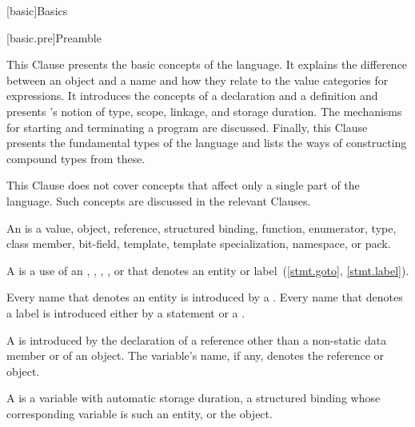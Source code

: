 [basic]{Basics}


[basic.pre]{Preamble}

\pnum
\begin{note}
This Clause presents the basic concepts of the \Cpp{} language.
It explains the difference between an object and a
name and how they relate to the value categories for expressions.
It introduces the concepts of a
declaration and a definition and presents \Cpp{}'s
notion of type, scope, linkage, and
storage duration. The mechanisms for starting and
terminating a program are discussed. Finally, this Clause presents the
fundamental types of the language and lists the ways of constructing
compound types from these.
\end{note}

\pnum
\begin{note}
This Clause does not cover concepts that affect only a single
part of the language. Such concepts are discussed in the relevant
Clauses.
\end{note}

\pnum
{}%
%
%
%
%
%
An  is a value, object, reference,
structured binding,
function, enumerator, type,
class member, bit-field, template, template specialization, namespace, or
pack.

\pnum
A  is a use of an ,
,
,
, or
 that denotes an entity or
label~(\ref{stmt.goto}, \ref{stmt.label}).

\pnum
Every name that denotes an entity is introduced by a
. Every name that denotes a label is introduced
either by a  statement or a
.

\pnum
A  is introduced by the
declaration of
a reference other than a non-static data member or of
an object. The variable's name, if any, denotes the reference or object.

\pnum
A  is a variable with
automatic storage duration,
a structured binding
whose corresponding variable is such an entity,
or the  object.

